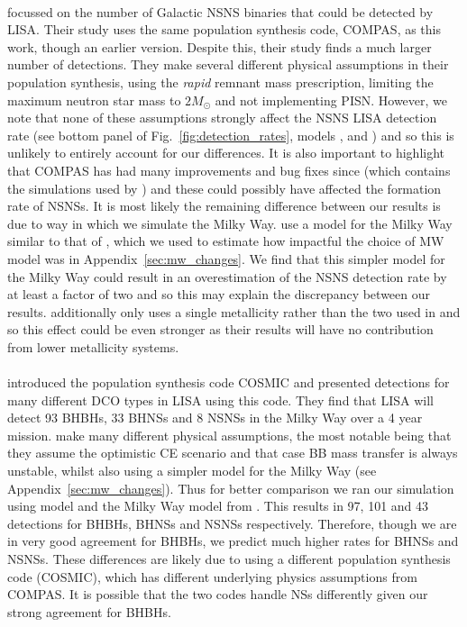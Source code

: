 \paragraph{\citet{Lau+2020}} focussed on the number of Galactic NSNS binaries that could be detected by LISA. Their study uses the same population synthesis code, COMPAS, as this work, though an earlier version. Despite this, their study finds a much larger number of detections. They make several different physical assumptions in their population synthesis, using the \citet{Fryer+2012} \textit{rapid} remnant mass prescription, limiting the maximum neutron star mass to $2 \unit{M_{\odot}}$ and not implementing PISN. However, we note that none of these assumptions strongly affect the NSNS LISA detection rate (see bottom panel of Fig.~\ref{fig:detection_rates}, models \modRapid{}, \modNSLow{} and \modNoPISN{}) and so this is unlikely to entirely account for our differences. It is also important to highlight that COMPAS has had many improvements and bug fixes since \citet{Vigna-Gomez+2018} (which contains the simulations used by \citet{Lau+2020}) and these could possibly have affected the formation rate of NSNSs.
%
It is most likely the remaining difference between our results is due to way in which we simulate the Milky Way. \citet{Lau+2020} use a model for the Milky Way similar to that of \citet{Breivik+2020}, which we used to estimate how impactful the choice of MW model was in Appendix~\ref{sec:mw_changes}. We find that this simpler model for the Milky Way could result in an overestimation of the NSNS detection rate by at least a factor of two and so this may explain the discrepancy between our results. \citet{Lau+2020} additionally only uses a single metallicity rather than the two used in \citet{Breivik+2020} and so this effect could be even stronger as their results will have no contribution from lower metallicity systems.

\paragraph{\citet{Breivik+2020}} introduced the population synthesis code COSMIC and presented detections for many different DCO types in LISA using this code. They find that LISA will detect 93 BHBHs, 33 BHNSs and 8 NSNSs in the Milky Way over a 4 year mission. \citet{Breivik+2020} make many different physical assumptions, the most notable being that they assume the optimistic CE scenario and that case BB mass transfer is always unstable, whilst also using a simpler model for the Milky Way (see Appendix~\ref{sec:mw_changes}). Thus for better comparison we ran our simulation using model \modCaseBBOpt{} and the Milky Way model from \citet{Breivik+2020}. This results in 97, 101 and 43 detections for BHBHs, BHNSs and NSNSs respectively. Therefore, though we are in very good agreement for BHBHs, we predict much higher rates for BHNSs and NSNSs. These differences are likely due to using a different population synthesis code (COSMIC), which has different underlying physics assumptions from COMPAS. It is possible that the two codes handle NSs differently given our strong agreement for BHBHs.

